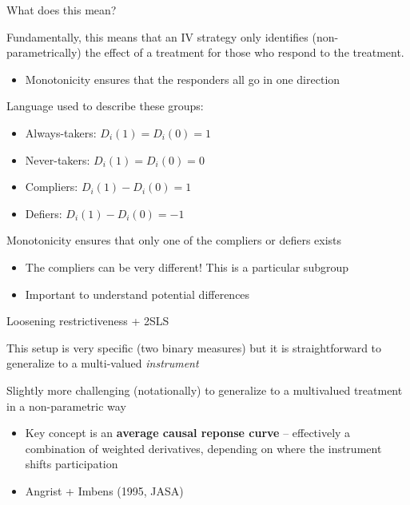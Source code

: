 \documentclass[notes,11pt, aspectratio=169]{beamer}
\newenvironment{wideitemize}{\itemize\addtolength{\itemsep}{10pt}}{\enditemize}
\begin{document}
\begin{frame}{What does this mean?}
  \begin{wideitemize}
  \item Fundamentally, this means that an IV strategy only identifies
    (non-parametrically) the effect of a treatment for those who
    respond to the treatment.
    \begin{itemize}
    \item     Monotonicity ensures that the responders all go in one direction
    \end{itemize}
  \item Language used to describe these groups:
    \begin{itemize}
    \item Always-takers: $D_{i}(1) = D_{i}(0) = 1$
    \item Never-takers: $D_{i}(1) = D_{i}(0) = 0$
    \item Compliers: $D_{i}(1) - D_{i}(0) = 1$
    \item Defiers: $D_{i}(1) - D_{i}(0) = -1$                   
    \end{itemize}
  \item Monotonicity ensures that only one of the compliers or defiers exists
    \begin{itemize}
    \item The compliers can be very different! This is a particular subgroup
    \item Important to understand potential differences
    \end{itemize}
  \end{wideitemize}
\end{frame}

\begin{frame}{Loosening restrictiveness + 2SLS}
  \begin{wideitemize}
  \item This setup is very specific (two binary measures) but it is
    straightforward to generalize to a multi-valued \emph{instrument}
  \item Slightly more challenging (notationally) to generalize to a multivalued
    treatment in a non-parametric way
    \begin{itemize}
    \item Key concept is an \textbf{average causal reponse curve} --
      effectively a combination of weighted derivatives, depending on
      where the instrument shifts participation
    \item  Angrist + Imbens (1995, JASA)
    \end{itemize}
  \end{wideitemize}
\end{frame}
\end{document}
